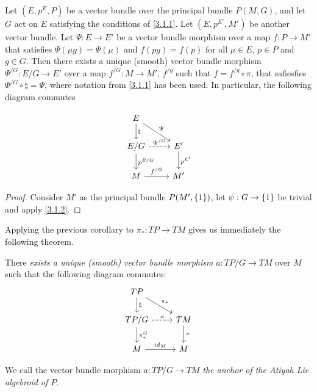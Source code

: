 \begin{corollary}
Let $(E, p^E, P)$ be a vector bundle over the principal bundle $P(M, G)$, and let $G$ act on $E$ satisfying the conditions of \ref{3.1.1}. Let $(E, p^{E'}, M')$ be another vector bundle. Let $\Psi: E \to E'$ be a vector bundle morphism over a map $f: P \to M'$ that satisfies $\Psi(\mu g) = \Psi(\mu)$ and $f(pg) = f(p)$ for all $\mu \in E$, $p \in P$ and $g \in G$. Then there exists a unique (smooth) vector bundle morphism $\Psi^{/G}: E/G \to E'$ over a map $f^{/G}: M \to M'$, $f^{/g}$ such that $f = f^{/g} \circ \pi$, that safiesfies $\Psi^{/G} \circ \natural = \Psi$, where notation from \ref{3.1.1} has been used. In particular, the following diagram commutes

\begin{equation} \label{anchorDiagram}
    \begin{tikzcd}
    E \arrow[]{d}{\natural} \arrow[]{dr}{\Psi}& \\
    E/G \arrow[dashed]{r}{\Psi^{/G}} \arrow[]{d}{p^{E/G}}& E' \arrow[]{d}{p^{E'}} \\
    M \arrow[]{r}{f^{/G}} & M'
    \end{tikzcd}
\end{equation}
\end{corollary}

\begin{proof}
Consider $M'$ as the principal bundle $P(M', \left\{ 1 \right\})$, let $\psi:G \to \left\{ 1 \right\}$ be trivial and apply \ref{3.1.2}.
\end{proof}

Applying the previous corollary to $\pi_*: TP \to TM$ gives us immediately the following theorem.

\begin{theorem}\label{anchorAtiyah}
There \emph{exists a unique (smooth) vector bundle morphism} $a: TP/G \to TM$ over $M$ such that the following diagram commutes:
\begin{equation} \label{anchorDiagram}
    \begin{tikzcd}
    TP \arrow[]{d}{\natural} \arrow[]{dr}{\pi_*}& \\
    TP/G \arrow[dashed]{r}{a} \arrow[]{d}{\pi_*^G}& TM \arrow[]{d}{\pi} \\
    M \arrow[]{r}{id_M} & M
    \end{tikzcd}
\end{equation}


We call the vector bundle morphism $a:TP/G \to TM$ \emph{the anchor of the Atiyah Lie algebroid of $P$}.
\end{theorem}

